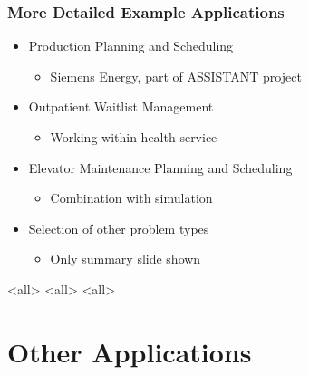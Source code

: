 \begin{frame}
\frametitle{More Detailed Example Applications}
\begin{itemize}
\item Production Planning and Scheduling
\begin{itemize}
\item Siemens Energy, part of ASSISTANT project
\end{itemize}
\item Outpatient Waitlist Management 
\begin{itemize}
\item Working within health service
\end{itemize}
\item Elevator Maintenance Planning and Scheduling
\begin{itemize}
\item Combination with simulation
\end{itemize}
\item Selection of other problem types
\begin{itemize}
\item Only summary slide shown
\end{itemize}
\end{itemize}
\end{frame}

\mode<all>{}
\mode<all>{}
\mode<all>{}

\section{Other Applications}


